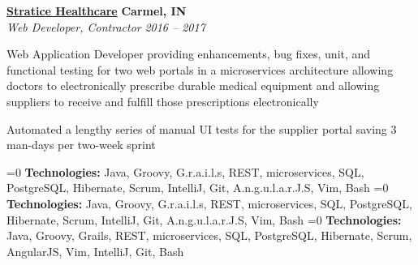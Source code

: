 %
    \headerrow
        {\textbf{\href{https://www.straticehealthcare.com/}{Stratice Healthcare}}}
        {\textbf{Carmel, IN}}
    \\
    \headerrow
        {\emph{Web Developer, Contractor}}
        {\emph{2016 -- 2017}}
    \begin{itemize*}
        \item Web Application Developer providing enhancements, bug fixes, unit, and functional testing for two
            web portals in a microservices architecture allowing doctors to electronically prescribe durable medical equipment and
            allowing suppliers to receive and fulfill those prescriptions electronically
        \item Automated a lengthy series of manual UI tests for the supplier portal saving 3 man-days per two-week sprint
    \end{itemize*}

    \ifnum{}=0
    \hspace{1.0em}
        {\textbf{Technologies:} Java, Groovy, G.r.a.i.l.s, REST, microservices, SQL, PostgreSQL, Hibernate, Scrum, IntelliJ, Git,
        A.n.g.u.l.a.r.J.S, Vim, Bash}
    \fi
    \ifnum{}=0
    \hspace{1.0em}
        {\textbf{Technologies:} Java, Groovy, G.r.a.i.l.s, REST, microservices, SQL, PostgreSQL, Hibernate, Scrum, IntelliJ, Git,
        A.n.g.u.l.a.r.J.S, Vim, Bash}
    \fi
    \ifnum{}=0
    \hspace{1.0em}
        {\textbf{Technologies:} Java, Groovy, Grails, REST, microservices, SQL, PostgreSQL, Hibernate, Scrum, AngularJS, Vim, IntelliJ, Git, Bash}
    \fi
